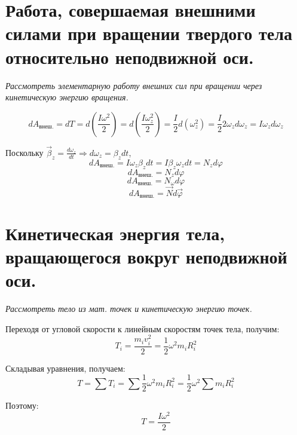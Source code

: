 \documentclass{article}
\begin{document}
    \section{Работа, совершаемая внешними силами при вращении твердого тела относительно неподвижной оси.}
    \par
      \textit{Рассмотреть элементарную работу внешних сил при вращении через кинетическую энергию вращения.}\\
    \par      
      \begin{equation}
	dA_\text{внеш.}=dT=d(\frac{I\omega^2}{2})=d(\frac{I\omega_z^2}{2})=\frac{I}{2}d(\omega_z^2)=\frac{I}{2}2\omega_zd\omega_z=I\omega_zd\omega_z
      \end{equation}
    \par
      Поскольку $\vec \beta_z=\frac{d\omega_z}{dt}\Rightarrow d\omega_z=\beta_z dt$, 
      \begin{equation}
	dA_\text{внеш.}=I\omega_z\beta_zdt=I\beta_z\omega_zdt=N_zd\varphi
      \end{equation}
      \begin{equation}
	dA_\text{внеш.}=N_zd\varphi
      \end{equation}
      \begin{equation}
	dA_\text{внеш.}=N_\omega d\varphi
      \end{equation}
      \begin{equation}
	dA_\text{внеш.}=\vec Nd\vec\varphi
      \end{equation}
  \clearpage
    
    \section{Кинетическая энергия тела, вращающегося вокруг неподвижной оси.}
    \par
      \textit{Рассмотреть тело из мат. точек и кинетическую энергию точек.}\\
    \par       
      Переходя от угловой скорости к линейным скоростям точек тела, получим:
      \begin{equation}
	T_i=\frac{m_iv_i^2}{2}=\frac{1}{2}\omega^2m_iR_i^2
      \end{equation}
    \par
      Складывая уравнения, получаем:
      \begin{equation}
	T=\sum T_i=\sum\frac{1}{2}\omega^2m_iR_i^2=\frac{1}{2}\omega^2\sum m_iR_i^2
      \end{equation}
    \par
      Поэтому:
      \begin{equation}
	T=\frac{I\omega^2}{2}
      \end{equation}
  \clearpage
    
\end{document}
